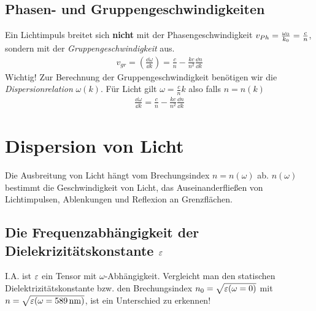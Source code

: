 \subsection{Phasen- und Gruppengeschwindigkeiten}
Ein Lichtimpuls breitet sich \textbf{nicht} mit der
Phasengeschwindigkeit $v_{Ph}=\frac{\omega_0}{k_0}=\frac{c}{n}$,
sondern mit der \emph{Gruppengeschwindigkeit}%
%
aus. 
\begin{gather}
  v_{gr}=\left(\frac{\dd \omega}{\dd k}\right)=\frac{c}{n}-\frac{kc}{n^2}\frac{\dd n}{\dd k}
\end{gather}
Wichtig! Zur Berechnung der Gruppengeschwindigkeit benötigen wir die
\emph{Dispersionrelation} $\omega(k)$. Für Licht gilt
$\omega=\frac{c}{n}k$ also falls $n=n(k)$
\begin{gather*}
  \frac{\dd \omega}{\dd k}=\frac{c}{n}-\frac{kc}{n^2}\frac{\dd n}{\dd k}
\end{gather*}

\section{Dispersion von Licht}
Die Ausbreitung von Licht hängt vom Brechungsindex $n=n(\omega)$
ab. $n(\omega)$ bestimmt die Geschwindigkeit von Licht, das
Auseinanderfließen von Lichtimpulsen, Ablenkungen und Reflexion an
Grenzflächen. 
\subsection{Die Frequenzabhängigkeit der Dielekrizitätskonstante $\varepsilon$}
I.A. ist $\varepsilon$ ein Tensor mit $\omega$-Abhängigkeit. Vergleicht man
den statischen Dielektrizitätskonstante bzw. den Brechungsindex
$n_0=\sqrt{\varepsilon(\omega=0)}$ mit $
n=\sqrt{\varepsilon(\omega=\SI{589}{\nano\meter})}$, ist ein Unterschied zu erkennen!






